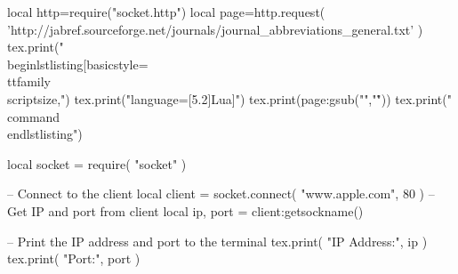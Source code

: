 \documentclass[]{article}
\begin{document}
\begin{luacode*}
    local http=require("socket.http")
    local page=http.request( 'http://jabref.sourceforge.net/journals/journal_abbreviations_general.txt' )
    tex.print("\\begin{lstlisting}[basicstyle=\\ttfamily\\scriptsize,")
    tex.print("language={[5.2]Lua}]")
    tex.print(page:gsub("\n","\r"))
    tex.print("\\command \\end{lstlisting}")
    
 local socket = require( "socket" )

-- Connect to the client
local client = socket.connect( "www.apple.com", 80 )
-- Get IP and port from client
local ip, port = client:getsockname()

-- Print the IP address and port to the terminal
tex.print( "IP Address:", ip )
tex.print( "Port:", port )   
    
\end{luacode*}
\end{document}
